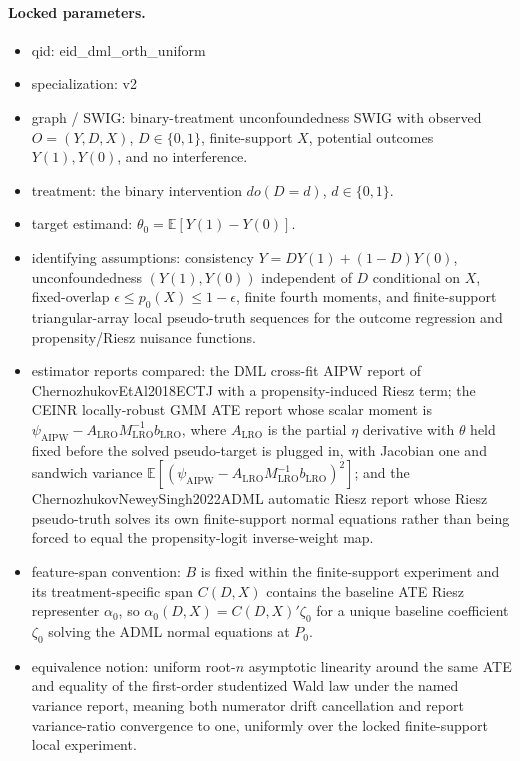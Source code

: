 \documentclass[11pt]{article}
\newcommand{\E}{\mathbb{E}}
\theoremstyle{definition}
\theoremstyle{plain}
\theoremstyle{remark}
\begin{document}
\paragraph{Locked parameters.}
\begin{itemize}
\item qid: eid\_dml\_orth\_uniform
\item specialization: v2
\item graph / SWIG: binary-treatment unconfoundedness SWIG with observed \(O=(Y,D,X)\), \(D\in\{0,1\}\), finite-support \(X\), potential outcomes \(Y(1),Y(0)\), and no interference.
\item treatment: the binary intervention \(do(D=d)\), \(d\in\{0,1\}\).
\item target estimand: \(\theta_0=\E[Y(1)-Y(0)]\).
\item identifying assumptions: consistency \(Y=DY(1)+(1-D)Y(0)\), unconfoundedness \((Y(1),Y(0))\) independent of \(D\) conditional on \(X\), fixed-overlap \(\epsilon \le p_0(X)\le 1-\epsilon\), finite fourth moments, and finite-support triangular-array local pseudo-truth sequences for the outcome regression and propensity/Riesz nuisance functions.
\item estimator reports compared: the DML cross-fit AIPW report of ChernozhukovEtAl2018ECTJ with a propensity-induced Riesz term; the CEINR locally-robust GMM ATE report whose scalar moment is \(\psi_{\mathrm{AIPW}}-A_{\mathrm{LRO}}M_{\mathrm{LRO}}^{-1}b_{\mathrm{LRO}}\), where \(A_{\mathrm{LRO}}\) is the partial \(\eta\) derivative with \(\theta\) held fixed before the solved pseudo-target is plugged in, with Jacobian one and sandwich variance \(\E[(\psi_{\mathrm{AIPW}}-A_{\mathrm{LRO}}M_{\mathrm{LRO}}^{-1}b_{\mathrm{LRO}})^2]\); and the ChernozhukovNeweySingh2022ADML automatic Riesz report whose Riesz pseudo-truth solves its own finite-support normal equations rather than being forced to equal the propensity-logit inverse-weight map.
\item feature-span convention: \(B\) is fixed within the finite-support experiment and its treatment-specific span \(C(D,X)\) contains the baseline ATE Riesz representer \(\alpha_0\), so \(\alpha_0(D,X)=C(D,X)'\zeta_0\) for a unique baseline coefficient \(\zeta_0\) solving the ADML normal equations at \(P_0\).
\item equivalence notion: uniform root-\(n\) asymptotic linearity around the same ATE and equality of the first-order studentized Wald law under the named variance report, meaning both numerator drift cancellation and report variance-ratio convergence to one, uniformly over the locked finite-support local experiment.
\end{itemize}
\end{document}
